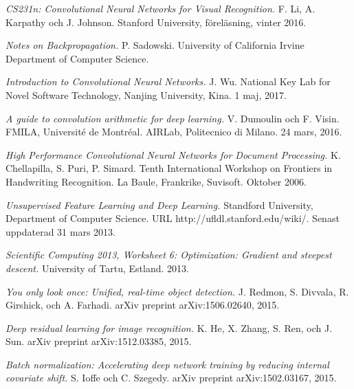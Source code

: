 \documentclass[a4paper,11pt,twoside]{article}
\begin{document}
\begin{thebibliography}{99}
    

	
	\textit{CS231n: Convolutional Neural Networks for Visual Recognition.}
    F. Li, A. Karpathy och J. Johnson.
	Stanford University, föreläsning, vinter 2016.
	
	\textit{Notes on Backpropagation.}
    P. Sadowski.
    University of California Irvine	Department of Computer Science.
    
	\textit{Introduction to Convolutional Neural Networks.}
    J. Wu. 
    National Key Lab for Novel Software Technology, Nanjing University, Kina.
    1 maj, 2017.

	\textit{A guide to convolution arithmetic for deep learning.}
    V. Dumoulin  och F. Visin.
    FMILA, Université de Montréal. AIRLab, Politecnico di Milano.
	24 mars, 2016.

	\textit{High Performance Convolutional Neural Networks for Document Processing.}
    K. Chellapilla, S. Puri, P. Simard.
    Tenth International Workshop on Frontiers in Handwriting Recognition. 
    La Baule, Frankrike, Suvisoft.
	Oktober 2006.

	\textit{Unsupervised Feature Learning and Deep Learning.}
    Standford University, Department of Computer Science.
    URL http://ufldl.stanford.edu/wiki/.
	Senast uppdaterad 31 mars 2013.
	
	\textit{Scientific Computing 2013, Worksheet 6: Optimization: Gradient and steepest descent.}
    University of Tartu, Estland.
    2013.
    
	\textit{You only look once: Unified, real-time object detection.}
    J. Redmon, S. Divvala, R. Girshick, och A. Farhadi. 
    arXiv preprint arXiv:1506.02640, 2015.

	\textit{Deep residual learning for image recognition.}
    K. He, X. Zhang, S. Ren, och J. Sun. 
    arXiv preprint arXiv:1512.03385, 2015.
    
	\textit{Batch normalization: Accelerating deep network training by reducing internal covariate shift.}
    S. Ioffe och C. Szegedy. 
	arXiv preprint arXiv:1502.03167, 2015.
    

\end{thebibliography}
\end{document}
